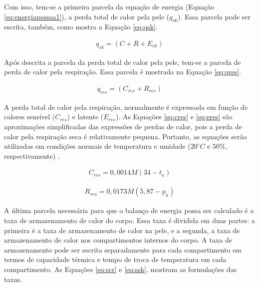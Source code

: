 \documentclass[acronym,symbols,table]{fei}
\begin{document}
Com isso, tem-se a primeira parcela da equação de energia (Equação \ref{eq:energiapessoa1}), a perda total de calor pela pele ($q_{sk}$). Essa parcela pode ser escrita, também, como mostra a Equação \ref{eq:qsk}.

\begin{equation} \label{eq:qsk}
    \begin{aligned}
   q_{sk}= (C + R + E_{sk})
    \end{aligned}
\end{equation}

Após descrita a parcela da perda total de calor pela pele, tem-se a parcela de perda de calor pela respiração. Essa parcela é mostrada na Equação \ref{eq:qres}.

\begin{equation} \label{eq:qres}
    \begin{aligned}
   q_{res}= (C_{res} + R_{res})
    \end{aligned}
\end{equation}

A perda total de calor pela respiração, normalmente é expressada em função de calores sensível ($C_{res}$) e latente ($E_{res}$). As Equações \ref{eq:cres} e \ref{eq:eres} são aproximações simplificadas das expressões de perdas de calor, pois a perda de calor pela respiração seca é relativamente pequena. Portanto, as equações serão utilizadas em condições normais de temperatura e umidade ($20^\circ C$ e $50\%$, respectivamente) \cite{ASHRAE2009}.

\begin{equation} \label{eq:cres}
    \begin{aligned}
   C_{res}= 0,0014M(34-t_{a})
    \end{aligned}
\end{equation}

\begin{equation} \label{eq:eres}
    \begin{aligned}
   R_{res}= 0,0173M(5,87-p_{a})
    \end{aligned}
\end{equation}

A última parcela necessária para que o balanço de energia possa ser calculado é a taxa de armazenamento de calor do corpo. Essa taxa é dividida em duas partes: a primeira é a taxa de armazenamento de calor na pele, e a segunda, a taxa de armazenamento de calor nos compartimentos internos do corpo. A taxa de armazenamento pode ser escrita separadamente para cada compartimento em termos de capacidade térmica e tempo de troca de temperatura em cada compartimento. \cite{ASHRAE2009} As Equações \ref{eq:scr} e \ref{eq:ssk}, mostram as formulações das taxas. 
\end{document}
